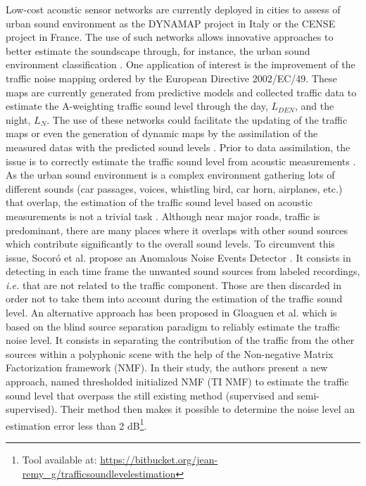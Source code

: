 \documentclass[12pt,english,twoside]{article}
\begin{document}
Low-cost acoustic sensor networks are currently deployed in cities to assess of urban sound environment as the DYNAMAP project \cite{dynamap_2016} in Italy or the CENSE project \cite{picaut2017characterization} in France. The use of such networks allows innovative approaches to better estimate the soundscape through, for instance, the urban sound environment classification \cite{maijala2018environmental}. One application of interest is the improvement of the traffic noise mapping ordered by the European Directive 2002/EC/49. These maps are currently generated from predictive models and collected traffic data to estimate the A-weighting traffic sound level through the day, $L_{DEN}$, and the night, $L_N$. The use of these networks could facilitate the updating of the traffic maps or even the generation of dynamic maps by the assimilation of the measured datas with the predicted sound levels \cite{ventura2018assimilation}. 
Prior to data assimilation, the issue is to correctly estimate the traffic sound level from acoustic measurements \cite{leiba2017large,socoro2017anomalous}. As the urban sound environment is a complex environment gathering lots of different sounds (car passages, voices, whistling bird, car horn, airplanes, etc.) that overlap, the estimation of the traffic sound level  based on acoustic measurements is not a trivial task \cite{mesaros_sound_2015}. Although near major roads, traffic is predominant, there are many places where it overlaps with other sound sources which contribute significantly to the overall sound levels. To circumvent this issue, Socor\'o et al. propose an Anomalous Noise Events Detector \cite{socoro2017anomalous}. It consists in detecting in each time frame the unwanted sound sources from labeled recordings, \textit{i.e.} that are not related to the traffic component. Those are then discarded in order not to take them into account during the estimation of the traffic sound level.
An alternative approach has been proposed in Gloaguen et al. \cite{gloaguen2019road} which is based on the blind source separation paradigm to reliably estimate the traffic noise level. 
It consists in separating the contribution of the traffic from the other sources within a polyphonic scene with the help of the Non-negative Matrix Factorization framework (NMF). 
In their study, the authors present a new approach, named thresholded initialized NMF (TI NMF) to estimate the traffic sound level that overpass the still existing method (supervised and semi-supervised). Their method then makes it possible to determine the noise level an estimation error less than 2 dB\footnote{Tool available at: \url{https://bitbucket.org/jean-remy_g/trafficsoundlevelestimation}}. 
\end{document}
